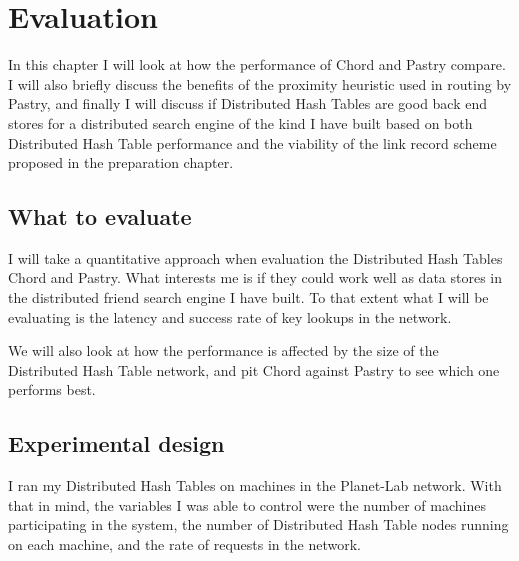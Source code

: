 

%
%
%
% 
%

\section{Evaluation}
In this chapter I will look at how the performance of Chord and Pastry compare. I will also briefly discuss the benefits of the proximity heuristic used in routing by Pastry, and finally I will discuss if Distributed Hash Tables are good back end stores for a distributed search engine of the kind I have built based on both Distributed Hash Table performance and the viability of the link record scheme proposed in the preparation chapter.

\subsection{What to evaluate}
I will take a quantitative approach when evaluation the Distributed Hash Tables Chord and Pastry. What interests me is if they could work well as data stores in the distributed friend search engine I have built. To that extent what I will be evaluating is the latency and success rate of key lookups in the network.

We will also look at how the performance is affected by the size of the Distributed Hash Table network, and pit Chord against Pastry to see which one performs best.

\subsection{Experimental design}
I ran my Distributed Hash Tables on machines in the Planet-Lab network. With that in mind, the variables I was able to control were the number of machines participating in the system, the number of Distributed Hash Table nodes running on each machine, and the rate of requests in the network.

